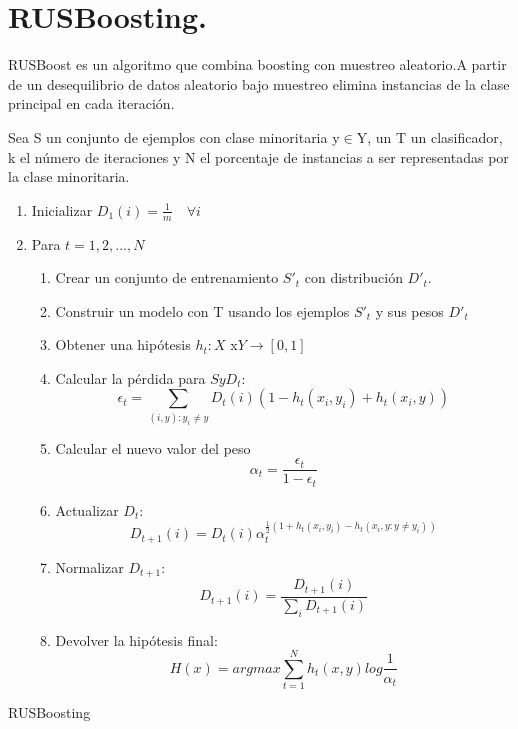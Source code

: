 \section{RUSBoosting.}
RUSBoost es un algoritmo que combina boosting con muestreo aleatorio.A partir de un desequilibrio de datos aleatorio bajo muestreo
elimina instancias de la clase principal en cada iteración. 
\begin{algorithm}[H]
	Sea S un conjunto de ejemplos con clase minoritaria y$\in$Y, un T un clasificador, k el número de iteraciones y N el porcentaje de instancias a ser representadas por la clase minoritaria.
	\begin{enumerate}
		\item Inicializar $D_1(i) = \frac{1}{m}\quad \forall i$
		\item Para $t=1,2,...,N$
		\begin{enumerate}
			\item Crear un conjunto de entrenamiento $S'_t$ con distribución $D'_t$.
			\item Construir un modelo con T usando los ejemplos $S'_t$ y sus pesos $D'_t$ 
			\item Obtener una hipótesis $h_t : X$ x$ Y \to [0,1]$
			\item Calcular la pérdida para $S y D_t$:
			$$
			\epsilon_t = \sum_{(i,y):y_i\neq y} D_t(i)(1-h_t(x_i,y_i)+h_t(x_i,y))
			$$
			\item Calcular el nuevo valor del peso
			$$\alpha_t = \frac{\epsilon_t}{1-\epsilon_t}$$
			\item Actualizar $D_t$:
			$$
			D_{t+1} (i) = D_t(i) \alpha_t^{\frac{1}{2}(1+h_t(x_i,y_i)-h_t(x_i,y:y\neq y_i))}
			$$		
			\item Normalizar $D_{t+1}$:
			$$
			 D_{t+1}(i) = \frac{D_{t+1}(i)}{\sum_{i}D_{t+1}(i)}
			$$
			\item Devolver la hipótesis final:
			$$
			H(x) = argmax \sum_{t=1}^{N}h_t(x,y)log\frac{1}{\alpha_t}
			$$
		\end{enumerate}
	\end{enumerate} 
  \caption{RUSBoosting}
\end{algorithm}
